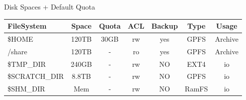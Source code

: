\documentclass[final,t]{beamer}
\begin{document}
\begin{frame}[fragile]{}
\begin{columns}[t]
\begin{column}{.32\linewidth}
      \begin{block}{Disk Spaces + Default Quota}
        \vspace*{-2ex}
      \begin{center}
      \begin{tabular}{|l|c|c|c|c|c|c|}
      \hline 
      \textbf{FileSystem} & \textbf{Space} & \textbf{Quota} & \textbf{ACL} & \textbf{Backup} & \textbf{Type} & \textbf{Usage}  \\ 
      \hline 
      \$HOME & 120TB & 30GB & rw & yes & GPFS & Archive \\ 
      \hline 
      /share & 120TB & - & ro & yes & GPFS & Archive \\ 
      \hline 
      \$TMP\_DIR & 240GB & - & rw & NO & EXT4 & io \\ 
      \hline 
      \$SCRATCH\_DIR & 8.8TB & - & rw & NO & GPFS & io \\ 
      \hline 
      \$SHM\_DIR & Mem & - & rw & NO & RamFS & io \\ 
      \hline 
      \end{tabular} 
      \end{center}
        \vspace*{-2ex}
      \end{block}
 
 


 

     \end{column}

    

\end{columns}
\end{frame}
\end{document}
